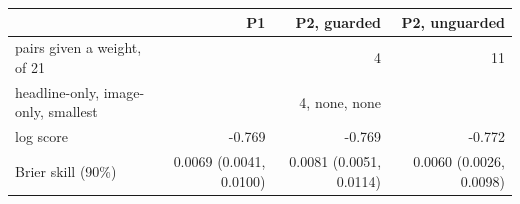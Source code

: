 \begin{tabular}{lrrr}
\toprule
 & P1 & P2, guarded & P2, unguarded \\
\midrule
pairs given a weight, of 21 &  & 4 & 11 \\
headline-only, image-only, smallest &  & 4, none, none &  \\
log score & -0.769 & -0.769 & -0.772 \\
Brier skill (90\%) & 0.0069 (0.0041, 0.0100) & 0.0081 (0.0051, 0.0114) & 0.0060 (0.0026, 0.0098) \\
\bottomrule
\end{tabular}
